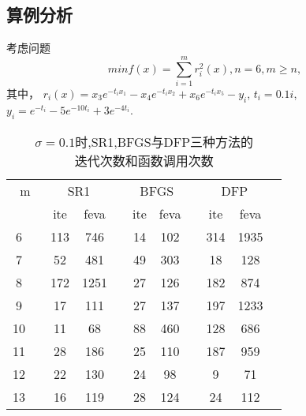         \subsection{算例分析}
            \begin{example}\label{nndfl}
                考虑问题
                \begin{equation}
                    min f(x) = \sum^m_{i=1}r_i^2(x), n=6,m\geq n,
                \end{equation}
                    其中，
                    $r_i(x)=x_3e^{-t_ix_1}-x_4e^{-t_ix_2}+x_6e^{-t_ix_5}-y_i$,
                    $t_i=0.1i$,
                    $y_i=e^{-t_i}-5e^{-10t_i}+3e^{-4t_i}$.
                
                \begin{table}[htbp]\center\label{nndf1}
                    \caption{$\sigma = 0.1$时,SR1,BFGS与DFP三种方法的
                            \\迭代次数和函数调用次数}
                    \begin{tabular}{cccccccccccc}
                    \toprule %
                        \multicolumn{3}{c}{m}& 
                        \multicolumn{2}{c}{SR1}&&                  \multicolumn{2}{c}{BFGS}&&                 \multicolumn{2}{c}{DFP}&\\
                    \cmidrule(lr){4-12}
                        \multicolumn{2}{c}{}&&ite&feva&&ite&feva&&ite&feva&\\  %
                    \hline %
                        \multicolumn{2}{c}{6} & &113&746 & &14&102& &314&1935& \\
                        \multicolumn{2}{c}{7} & &52 &481 & &49&303& &18 &128 & \\
                        \multicolumn{2}{c}{8} & &172&1251& &27&126& &182&874 & \\
                        \multicolumn{2}{c}{9} & &17 &111 & &27&137& &197&1233& \\
                        \multicolumn{2}{c}{10}& &11 &68  & &88&460& &128&686 & \\
                        \multicolumn{2}{c}{11}& &28 &186 & &25&110& &187&959 & \\
                        \multicolumn{2}{c}{12}& &22 &130 & &24&98 & &9  &71  & \\
                        \multicolumn{2}{c}{13}& &16 &119 & &28&124& &24 &112 & \\
                    \bottomrule %
                    \end{tabular}
                    \label{tableExample1}
                \end{table}
                

\end{example}
